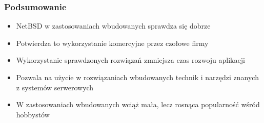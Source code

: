 \documentclass[dvipsnames,table]{beamer}
\begin{document}
\begin{frame}
\frametitle{Podsumowanie}
\begin{itemize}
	\item NetBSD w zastosowaniach wbudowanych sprawdza się dobrze
	\item Potwierdza to wykorzystanie komercyjne przez czołowe firmy
	\item Wykorzystanie sprawdzonych rozwiązań zmniejsza czas rozwoju aplikacji
	\item Pozwala na użycie w rozwiązaniach wbudowanych technik i narzędzi znanych z systemów serwerowych
	\item W zastosowaniach wbudowanych wciąż mała, lecz rosnąca popularność wśród hobbystów
	\end{itemize}
\end{frame}
\end{document}

